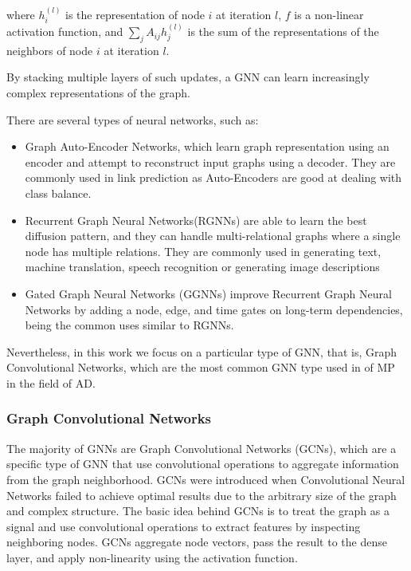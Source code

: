 where $h_i^{(l)}$ is the representation of node $i$ at iteration $l$, $f$ is a non-linear activation function, and $\sum_{j} A_{ij} h_j^{(l)}$ is the sum of the representations of the neighbors of node $i$ at iteration $l$.

By stacking multiple layers of such updates, a GNN can learn increasingly complex representations of the graph.

There are several types of neural networks, such as:

\begin{itemize}
	\item Graph Auto-Encoder Networks, which learn graph representation using an encoder and attempt to reconstruct input graphs using a decoder. They are commonly used in link prediction as Auto-Encoders are good at dealing with class balance. 
	\item Recurrent Graph Neural Networks(RGNNs) are able to learn the best diffusion pattern, and they can handle multi-relational graphs where a single node has multiple relations. They are commonly used in generating text, machine translation, speech recognition or generating image descriptions
	\item Gated Graph Neural Networks (GGNNs) improve Recurrent Graph Neural Networks by adding a node, edge, and time gates on long-term dependencies, being the common uses similar to RGNNs.
\end{itemize}

Nevertheless, in this work we focus on a particular type of GNN, that is, Graph Convolutional Networks, which are the most common GNN type used in of \ac{MP} in the field of \ac{AD}.

\subsubsection{Graph Convolutional Networks}
\label{subsubsec:3_gcns}

The majority of GNNs are Graph Convolutional Networks (GCNs), which are a specific type of GNN that use convolutional operations to aggregate information from the graph neighborhood. GCNs were introduced when Convolutional Neural Networks failed to achieve optimal results due to the arbitrary size of the graph and complex structure. The basic idea behind GCNs is to treat the graph as a signal and use convolutional operations to extract features by inspecting neighboring nodes. GCNs aggregate node vectors, pass the result to the dense layer, and apply non-linearity using the activation function. 

